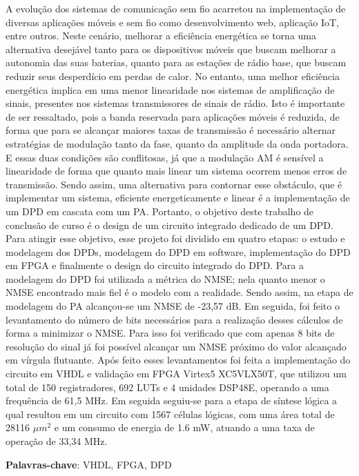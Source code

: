 A evolução dos sistemas de comunicação sem fio acarretou na implementação de diversas aplicações móveis e sem fio como desenvolvimento web, aplicação IoT, entre outros. Neste cenário, melhorar a eficiência energética se torna uma alternativa desejável tanto para os dispositivos móveis que buscam melhorar a autonomia das suas baterias, quanto para as estações de rádio base, que buscam reduzir seus desperdício em perdas de calor. No entanto, uma melhor eficiência energética implica em uma menor linearidade nos sistemas de amplificação de sinais, presentes nos sistemas transmissores de sinais de rádio. Isto é importante de ser ressaltado, pois a banda reservada para aplicações móveis é reduzida, de forma que para se alcançar maiores taxas de transmissão é necessário alternar estratégias de modulação tanto da fase, quanto da amplitude da onda portadora. E essas duas condições são conflitosas, já que a modulação AM é sensível a linearidade de forma que quanto mais linear um sistema ocorrem menos erros de transmissão. Sendo assim, uma alternativa para contornar esse obstáculo, que é implementar um sistema, eficiente energeticamente e linear é a implementação de um DPD em cascata com um PA. Portanto, o objetivo deste trabalho de conclusão de curso é o design de um circuito integrado dedicado de um DPD. Para atingir esse objetivo, esse projeto foi dividido em quatro etapas: o estudo e modelagem dos DPDs, modelagem do DPD em software, implementação do DPD em FPGA e finalmente o design do circuito integrado do DPD. Para a modelagem do DPD foi utilizada a métrica do NMSE; nela quanto menor o NMSE encontrado mais fiel é o modelo com a realidade. Sendo assim, na etapa de modelagem do PA alcançou-se um NMSE de -23,57 dB. Em seguida, foi feito o levantamento do número de bits necessários para a realização desses cálculos de forma a minimizar o NMSE. Para isso foi verificado que com apenas 8 bits de resolução do sinal já foi possível alcançar um NMSE próximo do valor alcançado em vírgula flutuante. Após feito esses levantamentos foi feita a implementação do circuito em VHDL e validação em FPGA Virtex5 XC5VLX50T, que utilizou um total de 150 registradores, 692 LUTs e 4 unidades DSP48E, operando a uma frequência de 61,5 MHz. Em seguida seguiu-se para a etapa de síntese lógica a qual resultou em um circuito com 1567 células lógicas, com uma área total de 28116 $ \mu m^2$ e um consumo de energia de 1.6 mW, atuando a uma taxa de operação de 33,34 MHz.

\textbf{Palavras-chave}: VHDL, FPGA, DPD 
